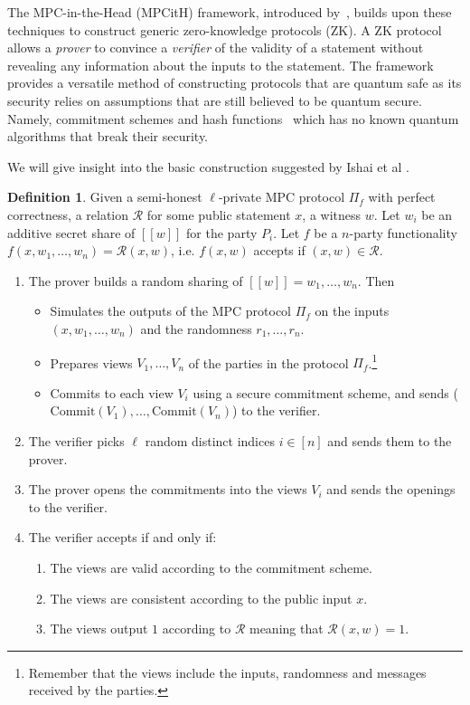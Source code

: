 \documentclass[twoside,11pt,openright]{report}
\theoremstyle{definition}
\newtheorem{definition}{Definition}[section]
\theoremstyle{plain}
\begin{document}
The MPC-in-the-Head (MPCitH) framework, introduced by~\cite{ishai2007zero}, builds upon these techniques to construct generic zero-knowledge protocols (ZK). A ZK protocol allows a \textit{prover} to convince a \textit{verifier} of the validity of a statement without revealing any information about the inputs to the statement. The framework provides a versatile method of constructing protocols that are quantum safe as its security relies on assumptions that are still believed to be quantum secure. Namely, commitment schemes and hash functions~\cite{feneuil2023threshold} which has no known quantum algorithms that break their security.

We will give insight into the basic construction suggested by Ishai et al \cite{ishai2007zero}.

\begin{definition}
  \label{def:mpcinth_basic}
  Given a semi-honest $\ell$-private MPC protocol $\Pi_f$ with perfect correctness, a relation $\mathcal{R}$ for some public statement $x$, a witness $w$. Let $w_i$ be an additive secret share of $[[w]]$ for the party $P_i$. Let $f$ be a $n$-party functionality $f(x, w_1, \dots, w_n) = \mathcal{R}(x, w)$, i.e. $f(x,w)$ accepts if $(x,w) \in \mathcal{R}$.
  \begin{enumerate}
    \item The prover builds a random sharing of $[[w]] = w_1, \dots, w_n$. Then
          \begin{itemize}
            \item Simulates the outputs of the MPC protocol $\Pi_f$ on the inputs $(x, w_1, \dots, w_n)$ and the randomness $r_1, \dots, r_n$.
            \item Prepares views $V_1, \dots, V_n$ of the parties in the protocol $\Pi_f$.\footnote{Remember that the views include the inputs, randomness and messages received by the parties.}
            \item Commits to each view $V_i$ using a secure commitment scheme, and sends ($\text{Commit}(V_1), \dots, \text{Commit}(V_n)$) to the verifier.
          \end{itemize}
    \item The verifier picks $\ell$ random distinct indices $i \in [n]$ and sends them to the prover.
    \item The prover opens the commitments into the views $V_i$ and sends the openings to the verifier.
    \item The verifier accepts if and only if:
          \begin{enumerate}
            \item\label{prop:mpcinth_commit} The views are valid according to the commitment scheme.
            \item\label{prop:mpcinth_consistent} The views are consistent according to the public input $x$.
            \item\label{prop:mpcinth_knowledge} The views output $1$ according to $\mathcal{R}$ meaning that $\mathcal{R}(x,w) = 1$.
          \end{enumerate}
  \end{enumerate}
\end{definition}
\end{document}
